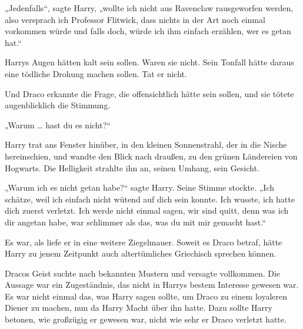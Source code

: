 „Jedenfalls“, sagte Harry, „wollte ich nicht aus Ravenclaw rausgeworfen werden, also versprach ich Professor Flitwick, dass nichts in der Art noch einmal vorkommen würde und falls doch, würde ich ihm einfach erzählen, wer es getan hat.“

Harrys Augen hätten kalt sein sollen. Waren sie nicht. Sein Tonfall hätte daraus eine tödliche Drohung machen sollen. Tat er nicht.

Und Draco erkannte die Frage, die offensichtlich hätte sein sollen, und sie tötete augenblicklich die Stimmung.

„Warum … hast du es nicht?“

Harry trat ans Fenster hinüber, in den kleinen Sonnenstrahl, der in die Nische hereinschien, und wandte den Blick nach draußen, zu den grünen Ländereien von Hogwarts. Die Helligkeit strahlte ihn an, seinen Umhang, sein Gesicht.

„Warum ich es nicht getan habe?“ sagte Harry. Seine Stimme stockte.
„Ich schätze, weil ich einfach nicht wütend auf dich sein konnte. Ich wusste, ich hatte dich zuerst verletzt. Ich werde nicht einmal sagen, wir sind quitt, denn was ich dir angetan habe, war schlimmer als das, was du mit mir gemacht hast.“

Es war, als liefe er in eine weitere Ziegelmauer. Soweit es Draco betraf, hätte Harry zu jenem Zeitpunkt auch altertümliches Griechisch sprechen können.

Dracos Geist suchte nach bekannten Mustern und versagte vollkommen. Die Aussage war ein Zugeständnis, das nicht in Harrys bestem Interesse gewesen war. Es war nicht einmal das, was Harry sagen sollte, um Draco zu einem loyaleren Diener zu machen, nun da Harry Macht über ihn hatte. Dazu sollte Harry betonen, wie großzügig er gewesen war, nicht wie sehr er Draco verletzt hatte.

